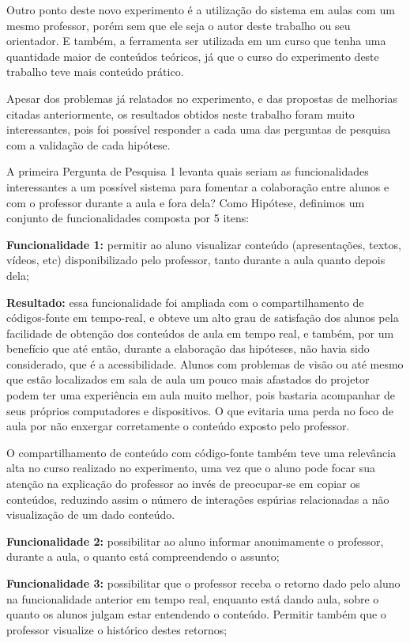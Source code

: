 Outro ponto deste novo experimento é a utilização do sistema em aulas com um mesmo professor, porém sem que ele seja o autor deste trabalho ou seu orientador. E também, a ferramenta ser utilizada em um curso que tenha uma quantidade maior de conteúdos teóricos, já que o curso do experimento deste trabalho teve mais conteúdo prático.

Apesar dos problemas já relatados no experimento, e das propostas de melhorias citadas anteriormente, os resultados obtidos neste trabalho foram muito interessantes, pois foi possível responder a cada uma das perguntas de pesquisa com a validação de cada hipótese.

A primeira Pergunta de Pesquisa 1 levanta quais seriam as funcionalidades interessantes a um possível sistema para fomentar a colaboração entre alunos e com o professor durante a aula e fora dela? Como Hipótese, definimos um conjunto de funcionalidades composta por 5 itens:

\textbf{Funcionalidade 1:} permitir ao aluno visualizar conteúdo (apresentações, textos, vídeos, etc) disponibilizado pelo professor, tanto durante a aula quanto depois dela;

\textbf{Resultado:} essa funcionalidade foi ampliada com o compartilhamento de códigos-fonte em tempo-real, e obteve um alto grau de satisfação dos alunos pela facilidade de obtenção dos conteúdos de aula em tempo real, e também, por um benefício que até então, durante a elaboração das hipóteses, não havia sido considerado, que é a acessibilidade. Alunos com problemas de visão ou até mesmo que estão localizados em sala de aula um pouco mais afastados do projetor podem ter uma experiência em aula muito melhor, pois bastaria acompanhar de seus próprios computadores e dispositivos. O que evitaria uma perda no foco de aula por não enxergar corretamente o conteúdo exposto pelo professor. 

O compartilhamento de conteúdo com código-fonte também teve uma relevância alta no curso realizado no experimento, uma vez que o aluno pode focar sua atenção na explicação do professor ao invés de preocupar-se em copiar os conteúdos, reduzindo assim o número de interações espúrias relacionadas a não visualização de um dado conteúdo.

\textbf{Funcionalidade 2:} possibilitar ao aluno informar anonimamente o professor, durante a aula, o quanto está compreendendo o assunto;

\textbf{Funcionalidade 3:} possibilitar que o professor receba o retorno dado pelo aluno na funcionalidade anterior em tempo real, enquanto está dando aula, sobre o quanto os alunos julgam estar entendendo o conteúdo. Permitir também que o professor visualize o histórico destes retornos;

